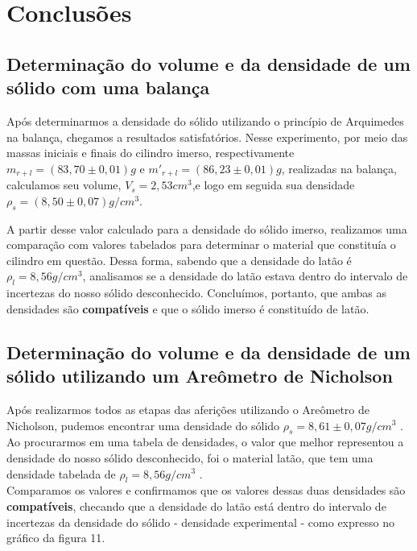 \newpage
\section{Conclusões}


\subsection{Determinação do volume e da densidade de um sólido com
uma balança}

Após determinarmos a densidade do sólido utilizando o princípio de Arquimedes na balança, chegamos a resultados satisfatórios. Nesse experimento, por meio das massas iniciais e finais do cilindro imerso, respectivamente $m_{r+l} = (83,70 \pm 0,01) g$ e $m'_{r+l} = (86,23 \pm 0,01) g$, realizadas na balança, calculamos seu volume, $V_s = 2,53 cm^3$,e logo em seguida sua densidade $\rho_s = (8,50 \pm 0,07) g/cm^3$.

A partir desse valor calculado para a densidade do sólido imerso, realizamos uma comparação com valores tabelados para determinar o material que constituía o cilindro em questão. Dessa forma, sabendo que a densidade do latão é $\rho_l = 8,56 g/cm^3$, analisamos se a densidade do latão estava dentro do intervalo de incertezas do nosso sólido desconhecido. Concluímos, portanto, que ambas as densidades são \textbf{compatíveis} e que o sólido imerso é constituído de latão.


\subsection{Determinação do volume e da densidade de um sólido
utilizando um Areômetro de Nicholson}

Após realizarmos todos as etapas das aferições utilizando o Areômetro de Nicholson, pudemos encontrar uma densidade do sólido $\rho _s = 8,61 \pm 0,07 g/cm^3$ . Ao procurarmos em uma tabela de densidades, o valor que melhor representou a densidade do nosso sólido desconhecido, foi o material latão, que tem uma densidade tabelada de $\rho_l = 8,56 g/cm^3$ . \\

Comparamos os valores e confirmamos que os valores dessas duas densidades são \textbf{compatíveis}, checando que a densidade do latão está dentro do intervalo de incertezas da densidade do sólido - densidade experimental - como expresso no gráfico da figura 11.\\

